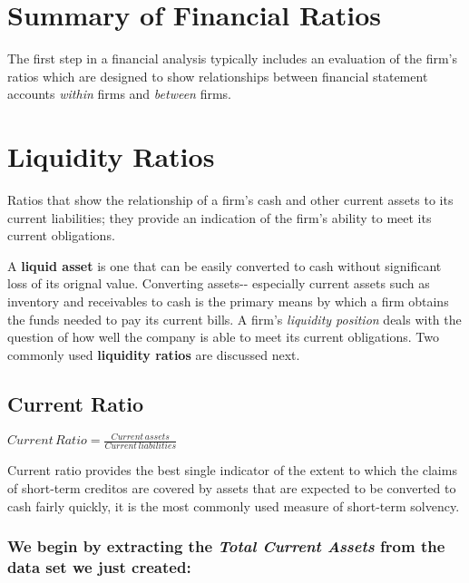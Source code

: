 \documentclass[11pt]{article}
\begin{document}
    \section{Summary of Financial Ratios}\label{summary-of-financial-ratios}

    The first step in a financial analysis typically includes an evaluation
of the firm's ratios which are designed to show relationships between
financial statement accounts \emph{within} firms and \emph{between}
firms.

    \section{Liquidity Ratios}\label{liquidity-ratios}

    Ratios that show the relationship of a firm's cash and other current
assets to its current liabilities; they provide an indication of the
firm's ability to meet its current obligations.

    A \textbf{liquid asset} is one that can be easily converted to cash
without significant loss of its orignal value. Converting assets-\/-
especially current assets such as inventory and receivables to cash is
the primary means by which a firm obtains the funds needed to pay its
current bills. A firm's \emph{liquidity position} deals with the
question of how well the company is able to meet its current
obligations. Two commonly used \textbf{liquidity ratios} are discussed
next.

    \subsection{Current Ratio}\label{current-ratio}

    \(Current\,Ratio = \frac{Current \, assets}{Current \, liabilities}\)

    Current ratio provides the best single indicator of the extent to which
the claims of short-term creditos are covered by assets that are
expected to be converted to cash fairly quickly, it is the most commonly
used measure of short-term solvency.

    \subsubsection{\texorpdfstring{We begin by extracting the \emph{Total
Current Assets} from the data set we just
created:}{We begin by extracting the Total Current Assets from the data set we just created:}}\label{we-begin-by-extracting-the-total-current-assets-from-the-data-set-we-just-created}
\end{document}
